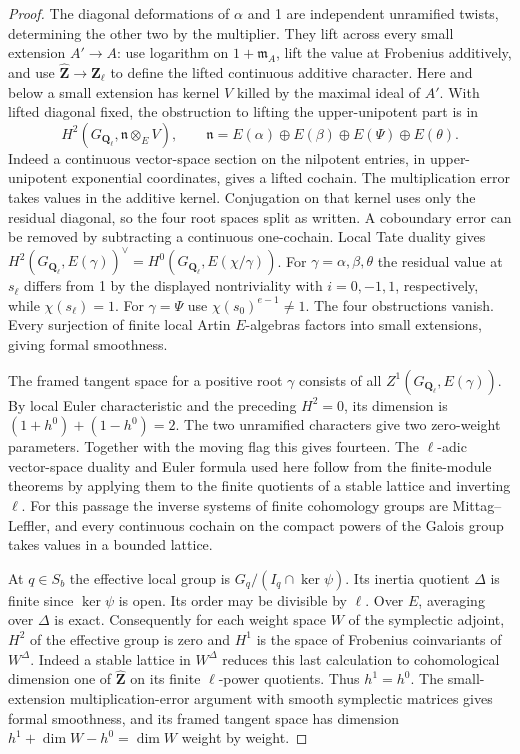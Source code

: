 \begin{proof}
The diagonal deformations of \(\alpha\) and 1 are independent
unramified twists, determining the other two by the multiplier.
They lift across every small extension \(A'\to A\): use logarithm
on \(1+\mathfrak m_A\), lift the value at Frobenius additively, and
use \(\widehat{\mathbf Z}\to\mathbf Z_\ell\) to define the lifted
continuous additive character. Here and below a small extension has
kernel \(V\) killed by the maximal ideal of \(A'\). With lifted
diagonal fixed, the obstruction to lifting the upper-unipotent part
is in
\[
 H^2(G_{\mathbf Q_\ell},\mathfrak n\otimes_E V),\qquad
 \mathfrak n=E(\alpha)\oplus E(\beta)\oplus E(\Psi)\oplus E(\theta).
\]
Indeed a continuous vector-space section on the nilpotent entries,
in upper-unipotent exponential coordinates, gives a lifted cochain.
The multiplication error takes values in the additive kernel.
Conjugation on that kernel uses only the residual diagonal, so the
four root spaces split as written. A coboundary error can be
removed by subtracting a continuous one-cochain. Local Tate duality
gives \(H^2(G_{\mathbf Q_\ell},E(\gamma))^\vee
=H^0(G_{\mathbf Q_\ell},E(\chi/\gamma))\).
For \(\gamma=\alpha,\beta,\theta\) the residual value at \(s_\ell\)
differs from 1 by the displayed nontriviality with \(i=0,-1,1\),
respectively, while \(\chi(s_\ell)=1\). For \(\gamma=\Psi\) use
\(\chi(s_0)^{e-1}\ne1\). The four obstructions vanish. Every
surjection of finite local Artin \(E\)-algebras factors into small
extensions, giving formal smoothness.

The framed tangent space for a positive root \(\gamma\) consists of
all \(Z^1(G_{\mathbf Q_\ell},E(\gamma))\). By local Euler
characteristic and the preceding \(H^2=0\), its dimension is
\((1+h^0)+(1-h^0)=2\). The two unramified characters give two
zero-weight parameters. Together with the moving flag this gives
fourteen. The \(\ell\)-adic vector-space duality and Euler formula
used here follow from the finite-module theorems by applying them
to the finite quotients of a stable lattice and inverting \(\ell\).
For this passage the inverse systems of finite cohomology groups
are Mittag--Leffler, and every continuous cochain on the compact
powers of the Galois group takes values in a bounded lattice.

At \(q\in S_b\) the effective local group is \(G_q/(I_q\cap\ker\psi)\).
Its inertia quotient \(\Delta\) is finite since \(\ker\psi\) is
open. Its order may be divisible by \(\ell\). Over \(E\), averaging
over \(\Delta\) is exact. Consequently for each weight space \(W\)
of the symplectic adjoint, \(H^2\) of the effective group is zero
and \(H^1\) is the space of Frobenius coinvariants of \(W^\Delta\).
Indeed a stable lattice in \(W^\Delta\) reduces this last calculation
to cohomological dimension one of \(\widehat{\mathbf Z}\) on its
finite \(\ell\)-power quotients. Thus \(h^1=h^0\).
The small-extension multiplication-error argument with smooth
symplectic matrices gives formal smoothness, and its framed tangent
space has dimension \(h^1+\dim W-h^0=\dim W\) weight by weight.


\end{proof}
